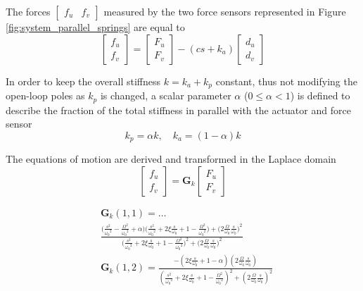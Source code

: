 \documentclass[10pt]{iopart}
\begin{document}
\par
The forces \(\begin{bmatrix}f_u & f_v\end{bmatrix}\) measured by the two force sensors represented in Figure \ref{fig:system_parallel_springs} are equal to
\begin{equation}
\label{eq:measured_force_kp}
  \begin{bmatrix} f_{u} \\ f_{v} \end{bmatrix} =
  \begin{bmatrix} F_u \\ F_v \end{bmatrix} - (c s + k_a)
  \begin{bmatrix} d_u \\ d_v \end{bmatrix}
\end{equation}

In order to keep the overall stiffness \(k = k_a + k_p\) constant, thus not modifying the open-loop poles as \(k_p\) is changed, a scalar parameter \(\alpha\) (\(0 \le \alpha < 1\)) is defined to describe the fraction of the total stiffness in parallel with the actuator and force sensor
\begin{equation}
  k_p = \alpha k, \quad k_a = (1 - \alpha) k
\end{equation}

The equations of motion are derived and transformed in the Laplace domain
\begin{equation}
\label{eq:Gk_mimo_tf}
  \begin{bmatrix} f_u \\ f_v \end{bmatrix} =
  \bm{G}_k
  \begin{bmatrix} F_u \\ F_v \end{bmatrix}
\end{equation}

\begin{subequations}
\label{eq:Gk}
\begin{align}
& \bm{G}_{k}(1,1) = \dots \nonumber \\
& {\scriptstyle \frac{\big( \frac{s^2}{{\omega_0}^2} - \frac{\Omega^2}{{\omega_0}^2} + \alpha \big) \big( \frac{s^2}{{\omega_0}^2} + 2 \xi \frac{s}{\omega_0} + 1 - \frac{{\Omega}^2}{{\omega_0}^2} \big) + \big( 2 \frac{\Omega}{\omega_0} \frac{s}{\omega_0} \big)^2}{\big( \frac{s^2}{{\omega_0}^2} + 2 \xi \frac{s}{\omega_0} + 1 - \frac{{\Omega}^2}{{\omega_0}^2} \big)^2 + \big( 2 \frac{\Omega}{\omega_0} \frac{s}{\omega_0} \big)^2} } \\
& \bm{G}_{k}(1,2) = {\scriptscriptstyle \frac{- \left( 2 \xi \frac{s}{\omega_0} + 1 - \alpha \right) \left( 2 \frac{\Omega}{\omega_0} \frac{s}{\omega_0} \right)}{\left( \frac{s^2}{{\omega_0}^2} + 2 \xi \frac{s}{\omega_0} + 1 - \frac{{\Omega}^2}{{\omega_0}^2} \right)^2 + \left( 2 \frac{\Omega}{\omega_0} \frac{s}{\omega_0} \right)^2} }
\end{align}
\end{subequations}
\end{document}
